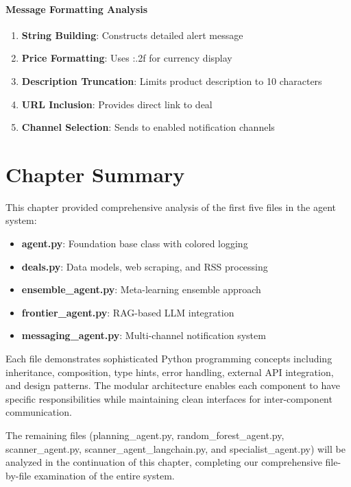 \paragraph{Message Formatting Analysis}
\begin{enumerate}
\item \textbf{String Building}: Constructs detailed alert message
\item \textbf{Price Formatting}: Uses :.2f for currency display
\item \textbf{Description Truncation}: Limits product description to 10 characters
\item \textbf{URL Inclusion}: Provides direct link to deal
\item \textbf{Channel Selection}: Sends to enabled notification channels
\end{enumerate}

\section{Chapter Summary}

This chapter provided comprehensive analysis of the first five files in the agent system:

\begin{itemize}
\item \textbf{agent.py}: Foundation base class with colored logging
\item \textbf{deals.py}: Data models, web scraping, and RSS processing
\item \textbf{ensemble\_agent.py}: Meta-learning ensemble approach
\item \textbf{frontier\_agent.py}: RAG-based LLM integration
\item \textbf{messaging\_agent.py}: Multi-channel notification system
\end{itemize}

Each file demonstrates sophisticated Python programming concepts including inheritance, composition, type hints, error handling, external API integration, and design patterns. The modular architecture enables each component to have specific responsibilities while maintaining clean interfaces for inter-component communication.

The remaining files (planning\_agent.py, random\_forest\_agent.py, scanner\_agent.py, scanner\_agent\_langchain.py, and specialist\_agent.py) will be analyzed in the continuation of this chapter, completing our comprehensive file-by-file examination of the entire system.